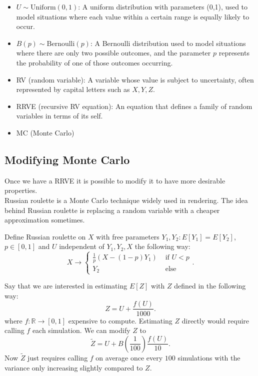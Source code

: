 \documentclass[a4paper,12pt]{article}
\begin{document}
\begin{itemize}
    \item $U \sim \text{Uniform}(0,1)$:
          A uniform distribution with parameters (0,1), used
          to model situations where each value within a certain
          range is equally likely to occur.
    \item $B(p) \sim \text{Bernoulli}(p)$:
          A Bernoulli distribution used to model
          situations where there are only two possible outcomes, and
          the parameter $p$ represents the probability of one of those outcomes occurring.
    \item RV (random variable):
          A variable whose value is subject to uncertainty,
          often represented by capital letters such as $X,Y,Z$.
    \item RRVE (recursive RV equation): An equation that defines a
          family of random variables in terms of its self.
    \item MC (Monte Carlo)
\end{itemize}


\subsection{Modifying Monte Carlo}
Once we have a RRVE it is possible to modify it
to have more desirable properties. \\

Russian roulette is a Monte Carlo technique widely used in rendering. The idea behind
Russian roulette is replacing a random variable with a cheaper approximation sometimes.

\begin{definition} \label{Russian roulette}
    Define Russian roulette on $X$ with free parameters
    $Y_{1},Y_{2}: E[Y_{1}] = E[Y_{2}]$, $p \in [0,1]$ and $U$
    independent of $Y_{1},Y_{2},X$ the following way:
    \[
        X \rightarrow \begin{cases}
            \frac{1}{p}(X- (1-p)Y_{1}) & \text{ if } U<p \\
            Y_{2}                      & \text{ else }
        \end{cases}
        .\]
\end{definition}

\begin{example}
    Say that we are interested in estimating $E[Z]$ with $Z$
    defined in the following way:
    \[
        Z = U + \frac{f(U)}{1000}
        .\]
    where $f:\mathbb{R} \rightarrow [0,1]$ expensive to compute.
    Estimating $Z$ directly would require calling $f$ each
    simulation. We can modify $Z$ to
    \[
        \tilde{Z} = U + B\left(\frac{1}{100}\right)\frac{f(U)}{10}
        .\]
    Now $\tilde{Z}$
    just requires calling $f$ on average once every $100$ simulations with the variance
    only increasing slightly compared to $Z$.
\end{example}
\end{document}
